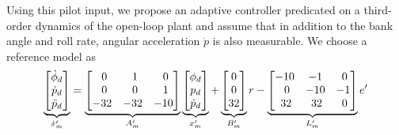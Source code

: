Using this pilot input, we propose an adaptive controller predicated on a third-order dynamics of the open-loop plant and assume that in addition to the bank angle and roll rate, angular acceleration $\dot{p}$ is also measurable. We choose a reference model as
\begin{equation}
	\underbrace{\begin{bmatrix}
		\dot{\phi}_d \\ \dot{p}_d \\ \ddot{p}_d
	\end{bmatrix}}_{\dot{x}_m'} = \underbrace{\begin{bmatrix}
		\hfil 0 & \hfil 1 & \hfil 0\\ \hfil 0 & \hfil 0 & \hfil 1 \\ -32 & -32 & -10
	\end{bmatrix}}_{A_m'} \underbrace{\begin{bmatrix}
		\phi_d \\ p_d \\ \dot{p}_d
	\end{bmatrix}}_{x_m'} + \underbrace{\begin{bmatrix}
		0 \\ 0 \\ 32
	\end{bmatrix}}_{B_m'} r - \underbrace{\begin{bmatrix}
		-10 & -1 & \hfil 0 \\ \hfil 0 & -10 & -1 \\ \hfil 32 & \hfil 32 & \hfil 0
	\end{bmatrix}}_{L_m'} e'
	\label{eqn:rm_3}
\end{equation}


